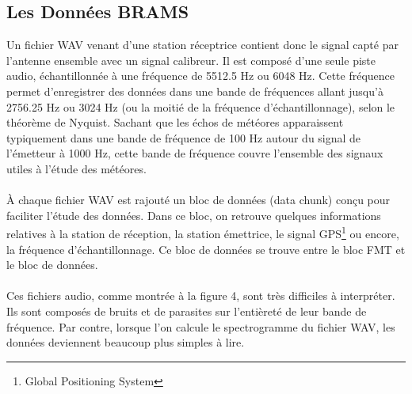 \documentclass[11pt]{article}
\begin{document}


\subsection{Les Données BRAMS}

Un fichier WAV venant d'une station réceptrice contient donc le signal capté par l'antenne ensemble avec un signal calibreur.
Il est composé d'une seule piste audio, échantillonnée à une fréquence de 5512.5 Hz ou 6048 Hz.
Cette fréquence permet d'enregistrer des données dans une bande de fréquences allant jusqu'à 2756.25 Hz ou 3024 Hz (ou la moitié de la fréquence d'échantillonnage), selon le théorème de Nyquist.
Sachant que les échos de météores apparaissent typiquement dans une bande de fréquence de 100 Hz autour du signal de l'émetteur à 1000 Hz, cette bande de fréquence couvre l'ensemble des signaux utiles à l'étude des météores.\\
\\
À chaque fichier WAV est rajouté un bloc de données (data chunk) conçu pour faciliter l'étude des données.
Dans ce bloc, on retrouve quelques informations relatives à la station de réception, la station émettrice, le signal GPS\footnote{Global Positioning System} ou encore, la fréquence d'échantillonnage.
Ce bloc de données se trouve entre le bloc FMT et le bloc de données.\\
\\
Ces fichiers audio, comme montrée à la figure 4, sont très difficiles à interpréter.
Ils sont composés de bruits et de parasites sur l'entièreté de leur bande de fréquence.
Par contre, lorsque l'on calcule le spectrogramme du fichier WAV, les données deviennent beaucoup plus simples à lire.
\end{document}
